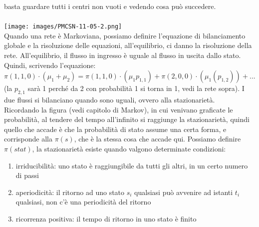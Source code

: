 \documentclass{article}
\begin{document}
basta guardare tutti i centri non vuoti e vedendo cosa può succedere.\\\\
\texttt{[image: images/PMCSN-11-05-2.png]}\\ 
Quando una rete è Markoviana, possiamo definire l'equazione di bilanciamento globale e la risoluzione delle equazioni, all'equilibrio, ci danno la risoluzione della rete. All'equilibrio, il flusso in ingresso è uguale al flusso in uscita dallo stato. Quindi, scrivendo l'equazione: $\pi(1,1,0)\cdot (\mu_1 + \mu_2) = \pi(1,1,0)\cdot (\mu_1 p_{1,1}) + \pi(2,0,0)\cdot (\mu_1 (p_{1,2})) + ...$ (la $p_{2,1}$ sarà 1 perché da 2 con probabilità 1 si torna in 1, vedi la rete sopra). I due flussi si bilanciano quando sono uguali, ovvero alla stazionarietà. \\ Ricordando la figura (vedi capitolo di Markov), in cui venivano graficate le probabilità, al tendere del tempo all'infinito si raggiunge la stazionarietà, quindi quello che accade è che la probabilità di stato assume una certa forma, e corrisponde alla $\pi(s)$, che è la stessa cosa che accade qui. Possiamo definire $\pi(stat)$, la stazionarietà esiste quando valgono determinate condizioni:
\begin{enumerate}
\item irriducibilità: uno stato è raggiungibile da tutti gli altri, in un certo numero di passi
\item aperiodicità: il ritorno ad uno stato $s_i$ qualsiasi può avvenire ad istanti $t_i$ qualsiasi, non c'è una periodicità del ritorno
\item ricorrenza positiva: il tempo di ritorno in uno stato è finito 
\end{enumerate}
\end{document}
